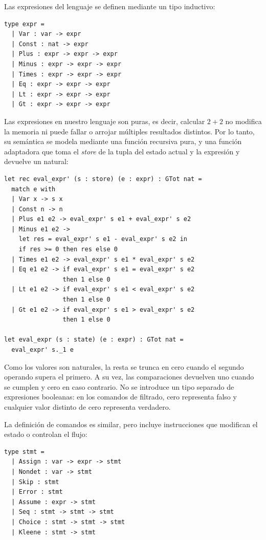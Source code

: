 \documentclass[a4paper,	11pt]{report}
\begin{document}
Las expresiones del lenguaje se definen mediante un tipo inductivo:

\begin{lstlisting}
type expr =
  | Var : var -> expr
  | Const : nat -> expr
  | Plus : expr -> expr -> expr
  | Minus : expr -> expr -> expr
  | Times : expr -> expr -> expr
  | Eq : expr -> expr -> expr
  | Lt : expr -> expr -> expr
  | Gt : expr -> expr -> expr
\end{lstlisting}

Las expresiones en nuestro lenguaje son puras,
es decir,
calcular $2 + 2$ no modifica la memoria ni puede fallar o arrojar múltiples resultados distintos.
Por lo tanto,
su semántica se modela mediante una función recursiva pura,
y una función adaptadora que toma el \emph{store} de la tupla del estado actual y la expresión y devuelve un natural:

\begin{lstlisting}
let rec eval_expr' (s : store) (e : expr) : GTot nat =
  match e with
  | Var x -> s x
  | Const n -> n
  | Plus e1 e2 -> eval_expr' s e1 + eval_expr' s e2
  | Minus e1 e2 ->
    let res = eval_expr' s e1 - eval_expr' s e2 in
    if res >= 0 then res else 0
  | Times e1 e2 -> eval_expr' s e1 * eval_expr' s e2
  | Eq e1 e2 -> if eval_expr' s e1 = eval_expr' s e2
                then 1 else 0
  | Lt e1 e2 -> if eval_expr' s e1 < eval_expr' s e2
                then 1 else 0
  | Gt e1 e2 -> if eval_expr' s e1 > eval_expr' s e2
                then 1 else 0

let eval_expr (s : state) (e : expr) : GTot nat =
  eval_expr' s._1 e
\end{lstlisting}

Como los valores son naturales,
la resta se trunca en cero cuando el segundo operando supera el primero.
A su vez,
las comparaciones devuelven uno cuando se cumplen y cero en caso contrario.
No se introduce un tipo separado de expresiones booleanas:
en los comandos de filtrado,
cero representa falso y cualquier valor distinto de cero representa verdadero.

La definición de comandos es similar,
pero incluye instrucciones que modifican el estado o controlan el flujo:

\begin{lstlisting}
type stmt =
  | Assign : var -> expr -> stmt
  | Nondet : var -> stmt
  | Skip : stmt
  | Error : stmt
  | Assume : expr -> stmt
  | Seq : stmt -> stmt -> stmt
  | Choice : stmt -> stmt -> stmt
  | Kleene : stmt -> stmt
\end{lstlisting}
\end{document}
